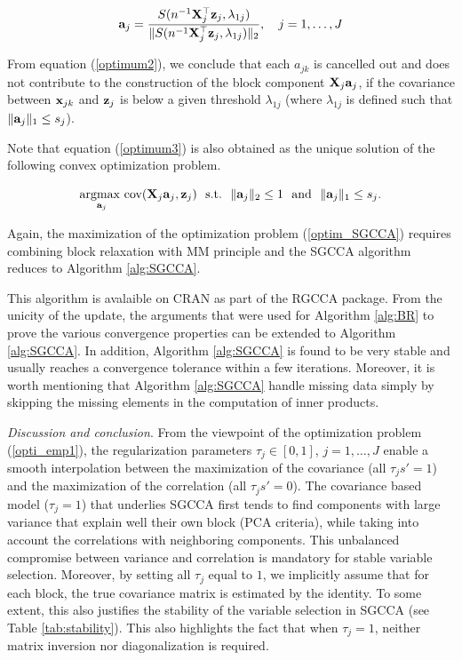 \documentclass[
]{jss}
\begin{document}
\begin{equation}
\mathbf{a}_j = \frac{S(n^{-1}\mathbf{X}_j^\top \mathbf{z}_j, \lambda_{1j})}{\Vert S(n^{-1}\mathbf{X}_j^\top \mathbf{z}_j, \lambda_{1j}) \Vert_2}, \text{~~~} j = 1, \ldots, J
\label{optimum3}
\end{equation}

From equation (\ref{optimum2}), we conclude that each \(a_{jk}\) is
cancelled out and does not contribute to the construction of the block
component \(\mathbf{X}_j \mathbf{a}_j\), if the covariance between \(\mathbf{x}_{jk}\) and
\(\mathbf{z}_j\) is below a given threshold \(\lambda_{1j}\) (where
\(\lambda_{1j}\) is defined such that \(\Vert \mathbf{a}_j \Vert_1 \le s_j\)).

Note that equation (\ref{optimum3}) is also obtained as the unique
solution of the following convex optimization problem.

\begin{equation}
\underset{\mathbf{a}_j}{\text{argmax~}} \text{cov}(\mathbf{X}_j \mathbf{a}_j,\mathbf{z}_j)  \textrm{~~s.t.~~} \Vert \mathbf{a}_j \Vert_2 \le 1  \text{~~and~~} \Vert \mathbf{a}_j \Vert_1 \le s_j. 
\label{max_convex}
\end{equation}

Again, the maximization of the optimization problem (\ref{optim_SGCCA})
requires combining block relaxation with MM principle and the SGCCA
algorithm reduces to Algorithm \ref{alg:SGCCA}.

This algorithm is avalaible on CRAN as part of the RGCCA package. From
the unicity of the update, the arguments that were used for Algorithm
\ref{alg:BR} to prove the various convergence properties can be extended
to Algorithm \ref{alg:SGCCA}. In addition, Algorithm \ref{alg:SGCCA} is
found to be very stable and usually reaches a convergence tolerance
within a few iterations. Moreover, it is worth mentioning that Algorithm
\ref{alg:SGCCA} handle missing data simply by skipping the missing
elements in the computation of inner products.

\textit{Discussion and conclusion}. From the viewpoint of the
optimization problem (\ref{opti_emp1}), the regularization parameters
\(\tau_j \in [0,1]\), \(j =1, \ldots, J\) enable a smooth interpolation
between the maximization of the covariance (all \(\tau_js'=1\)) and the
maximization of the correlation (all \(\tau_js'=0\)). The covariance
based model (\(\tau_j = 1\)) that underlies SGCCA first tends to find
components with large variance that explain well their own block (PCA
criteria), while taking into account the correlations with neighboring
components. This unbalanced compromise between variance and correlation
is mandatory for stable variable selection. Moreover, by setting all
\(\tau_j\) equal to \(1\), we implicitly assume that for each block, the
true covariance matrix is estimated by the identity. To some extent,
this also justifies the stability of the variable selection in SGCCA
(see Table \ref{tab:stability}). This also highlights the fact that when
\(\tau_j = 1\), neither matrix inversion nor diagonalization is
required.
\end{document}
